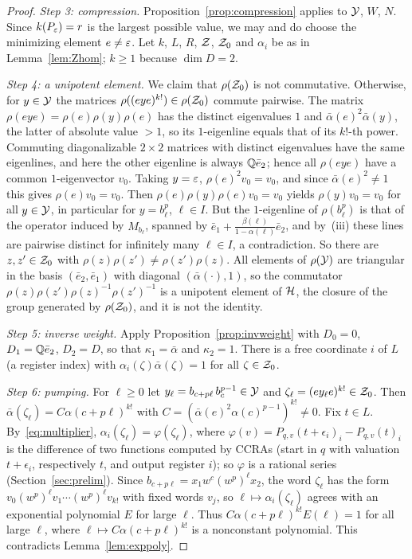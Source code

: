 \begin{proof}
\emph{Step 3: compression.} Proposition~\ref{prop:compression} applies to $\mathcal{Y}$, $W$, $N$. Since $k(P_\varepsilon)=r$ is the largest possible value, we may and do choose the minimizing element $e\ne\varepsilon$. Let $k$, $L$, $R$, $\mathcal{Z}$, $\mathcal{Z}_0$ and $\alpha_i$ be as in Lemma~\ref{lem:Zhom}; $k\ge1$ because $\dim D=2$.

\emph{Step 4: a unipotent element.} We claim that $\rho(\mathcal{Z}_0)$ is not commutative. Otherwise, for $y\in\mathcal{Y}$ the matrices $\rho((eye)^{k!})\in\rho(\mathcal{Z}_0)$ commute pairwise. The matrix $\rho(eye)=\rho(e)\rho(y)\rho(e)$ has the distinct eigenvalues $1$ and $\bar\alpha(e)^2\bar\alpha(y)$, the latter of absolute value $>1$, so its $1$-eigenline equals that of its $k!$-th power. Commuting diagonalizable $2\times2$ matrices with distinct eigenvalues have the same eigenlines, and here the other eigenline is always $\mathbb{Q}\bar e_2$; hence all $\rho(eye)$ have a common $1$-eigenvector $v_0$. Taking $y=\varepsilon$, $\rho(e)^2v_0=v_0$, and since $\bar\alpha(e)^2\ne1$ this gives $\rho(e)v_0=v_0$. Then $\rho(e)\rho(y)\rho(e)v_0=v_0$ yields $\rho(y)v_0=v_0$ for all $y\in\mathcal{Y}$, in particular for $y=b_\ell^p$, $\ell\in I$. But the $1$-eigenline of $\rho(b_\ell^p)$ is that of the operator induced by $M_{b_\ell}$, spanned by $\bar e_1+\frac{\beta(\ell)}{1-\alpha(\ell)}\bar e_2$, and by~(iii) these lines are pairwise distinct for infinitely many $\ell\in I$, a contradiction. So there are $z,z'\in\mathcal{Z}_0$ with $\rho(z)\rho(z')\ne\rho(z')\rho(z)$. All elements of $\rho(\mathcal{Y})$ are triangular in the basis $(\bar e_2,\bar e_1)$ with diagonal $(\bar\alpha(\cdot),1)$, so the commutator $\rho(z)\rho(z')\rho(z)^{-1}\rho(z')^{-1}$ is a unipotent element of $\mathcal{H}$, the closure of the group generated by $\rho(\mathcal{Z}_0)$, and it is not the identity.

\emph{Step 5: inverse weight.} Apply Proposition~\ref{prop:invweight} with $D_0=0$, $D_1=\mathbb{Q}\bar e_2$, $D_2=D$, so that $\kappa_1=\bar\alpha$ and $\kappa_2=1$. There is a free coordinate $i$ of $L$ (a register index) with $\alpha_i(\zeta)\bar\alpha(\zeta)=1$ for all $\zeta\in\mathcal{Z}_0$.

\emph{Step 6: pumping.} For $\ell\ge0$ let $y_\ell=b_{c+p\ell}\,b_c^{p-1}\in\mathcal{Y}$ and $\zeta_\ell=(ey_\ell e)^{k!}\in\mathcal{Z}_0$. Then $\bar\alpha(\zeta_\ell)=C\alpha(c+p\ell)^{k!}$ with $C=(\bar\alpha(e)^2\alpha(c)^{p-1})^{k!}\ne0$. Fix $t\in L$. By~\eqref{eq:multiplier}, $\alpha_i(\zeta_\ell)=\varphi(\zeta_\ell)$, where $\varphi(v)=P_{q,v}(t+\epsilon_i)_i-P_{q,v}(t)_i$ is the difference of two functions computed by CCRAs (start in $q$ with valuation $t+\epsilon_i$, respectively $t$, and output register $i$); so $\varphi$ is a rational series (Section~\ref{sec:prelim}). Since $b_{c+p\ell}=x_1w^c(w^p)^\ell x_2$, the word $\zeta_\ell$ has the form $v_0(w^p)^\ell v_1\cdots(w^p)^\ell v_{k!}$ with fixed words $v_j$, so $\ell\mapsto\alpha_i(\zeta_\ell)$ agrees with an exponential polynomial $E$ for large $\ell$. Thus $C\alpha(c+p\ell)^{k!}E(\ell)=1$ for all large $\ell$, where $\ell\mapsto C\alpha(c+p\ell)^{k!}$ is a nonconstant polynomial. This contradicts Lemma~\ref{lem:exppoly}.
\end{proof}

